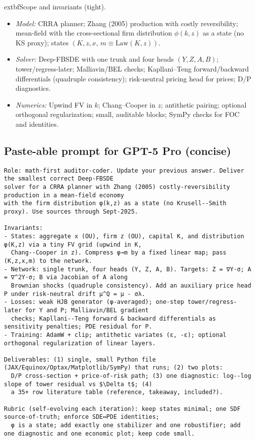 ﻿\documentclass[11pt,letterpaper,oneside]{article}
\numberwithin{equation}{section}
\newcommand{\1}{\mathbf{1}}
\begin{document}
\begin{tcolorbox}[didacticstyle]
  	extbf{Scope and invariants (tight).}
\begin{itemize}[leftmargin=1.15em,itemsep=0.25em]
  \item \emph{Model:} CRRA planner; Zhang (2005) production with costly reversibility; mean-field with the cross-sectional firm distribution $\phi(k,z)$ as a state (no KS proxy); states $(K,z,x,\,m\!\equiv\!\mathrm{Law}(K,z))$.
  \item \emph{Solver:} Deep-FBSDE with one trunk and four heads $(Y,Z,A,B)$; tower/regress-later; Malliavin/BEL checks; Kapllani--Teng forward/backward differentials (quadruple consistency); risk-neutral pricing head for prices; D/P diagnostics.
  \item \emph{Numerics:} Upwind FV in $k$; Chang--Cooper in $z$; antithetic pairing; optional orthogonal regularization; small, auditable blocks; SymPy checks for FOC and identities.
\end{itemize}
\end{tcolorbox}

\subsection*{Paste-able prompt for GPT-5 Pro (concise)}
\begin{tcolorbox}[sympycheckstyle,title={Prompt (paste verbatim)}]
\begin{Verbatim}[fontsize=\small]
Role: math-first auditor-coder. Update your previous answer. Deliver the smallest correct Deep-FBSDE
solver for a CRRA planner with Zhang (2005) costly-reversibility production in a mean-field economy
with the firm distribution φ(k,z) as a state (no Krusell--Smith proxy). Use sources through Sept-2025.

Invariants:
- States: aggregate x (OU), firm z (OU), capital K, and distribution φ(K,z) via a tiny FV grid (upwind in K,
  Chang--Cooper in z). Compress φ→m by a fixed linear map; pass (K,z,x,m) to the network.
- Network: single trunk, four heads (Y, Z, A, B). Targets: Z = ∇Y·σ; A = ∇^2Y·σ; B via Jacobian of A along
  Brownian shocks (quadruple consistency). Add an auxiliary price head P under risk-neutral drift μ^Q = μ - σλ.
- Losses: weak HJB generator (φ-averaged); one-step tower/regress-later for Y and P; Malliavin/BEL gradient
  checks; Kapllani--Teng forward & backward differentials as sensitivity penalties; PDE residual for P.
- Training: AdamW + clip; antithetic variates (ε, -ε); optional orthogonal regularization of linear layers.

Deliverables: (1) single, small Python file (JAX/Equinox/Optax/Matplotlib/SymPy) that runs; (2) two plots:
  D/P cross-section + price-of-risk path; (3) one diagnostic: log--log slope of tower residual vs $\Delta t$; (4)
  a 35+ row literature table (reference, takeaway, included?).

Rubric (self-evolving each iteration): keep states minimal; one SDF source-of-truth; enforce SDE↔PDE identities;
  φ is a state; add exactly one stabilizer and one robustifier; add one diagnostic and one economic plot; keep code small.
\end{Verbatim}
\end{tcolorbox}
\end{document}
